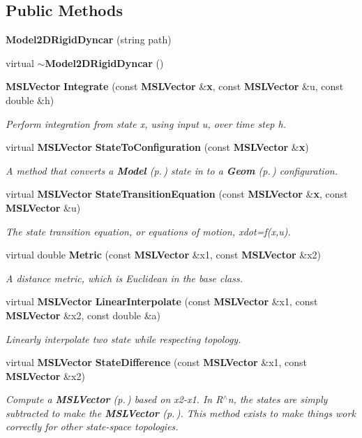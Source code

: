 \subsection*{Public Methods}
\begin{CompactItemize}
\item 
{\bf Model2DRigid\-Dyncar} (string path)
\item 
virtual {\bf $\sim$Model2DRigid\-Dyncar} ()
\item 
{\bf MSLVector} {\bf Integrate} (const {\bf MSLVector} \&{\bf x}, const {\bf MSLVector} \&u, const double \&h)
\begin{CompactList}\small\item\em Perform integration from state x, using input u, over time step h.\item\end{CompactList}\item 
virtual {\bf MSLVector} {\bf State\-To\-Configuration} (const {\bf MSLVector} \&{\bf x})
\begin{CompactList}\small\item\em A method that converts a {\bf Model} {\rm (p.\,\pageref{classModel})} state in to a {\bf Geom} {\rm (p.\,\pageref{classGeom})} configuration.\item\end{CompactList}\item 
virtual {\bf MSLVector} {\bf State\-Transition\-Equation} (const {\bf MSLVector} \&{\bf x}, const {\bf MSLVector} \&u)
\begin{CompactList}\small\item\em The state transition equation, or equations of motion, xdot=f(x,u).\item\end{CompactList}\item 
virtual double {\bf Metric} (const {\bf MSLVector} \&x1, const {\bf MSLVector} \&x2)
\begin{CompactList}\small\item\em A distance metric, which is Euclidean in the base class.\item\end{CompactList}\item 
virtual {\bf MSLVector} {\bf Linear\-Interpolate} (const {\bf MSLVector} \&x1, const {\bf MSLVector} \&x2, const double \&a)
\begin{CompactList}\small\item\em Linearly interpolate two state while respecting topology.\item\end{CompactList}\item 
virtual {\bf MSLVector} {\bf State\-Difference} (const {\bf MSLVector} \&x1, const {\bf MSLVector} \&x2)
\begin{CompactList}\small\item\em Compute a {\bf MSLVector} {\rm (p.\,\pageref{classMSLVector})} based on x2-x1. In R$^\wedge$n, the states are simply subtracted to make the {\bf MSLVector} {\rm (p.\,\pageref{classMSLVector})}. This method exists to make things work correctly for other state-space topologies.\item\end{CompactList}\end{CompactItemize}

